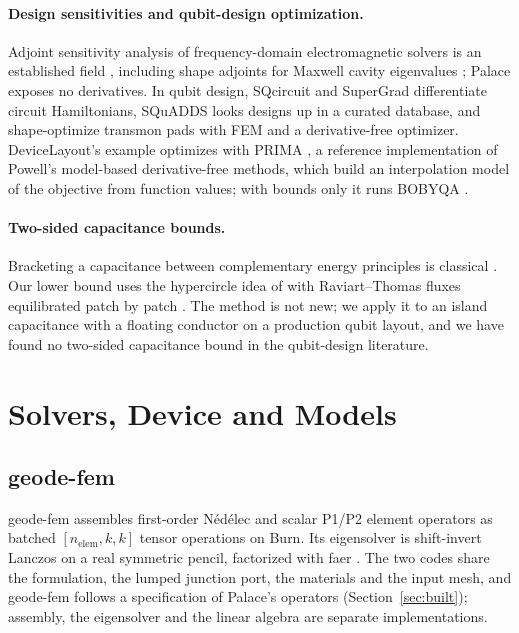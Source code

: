 \documentclass{anvil-paper}
\begin{document}
\paragraph{Design sensitivities and qubit-design optimization.}
Adjoint sensitivity analysis of frequency-domain electromagnetic solvers is
an established field \citep{nikolova2004adjoint}, including shape adjoints
for Maxwell cavity eigenvalues \citep{akcelik2005adjoint}; Palace exposes no
derivatives.
In qubit design, SQcircuit \citep{rajabzadeh2023analysis} and
SuperGrad \citep{wang2025supergrad} differentiate circuit Hamiltonians,
SQuADDS \citep{shanto2024squadds} looks designs up in a curated
database, and \citet{eun2023shape} shape-optimize transmon pads with FEM
and a derivative-free optimizer.
DeviceLayout's example optimizes with PRIMA \citep{zhang2023prima}, a
reference implementation of Powell's model-based derivative-free methods,
which build an interpolation model of the objective from function values;
with bounds only it runs BOBYQA \citep{powell2009bobyqa}.

\paragraph{Two-sided capacitance bounds.}
Bracketing a capacitance between complementary energy principles is
classical \citep{specogna2011complementary}. Our lower bound uses the
hypercircle idea of \citet{prager1947approximations} with Raviart--Thomas
fluxes \citep{raviart1977mixed} equilibrated patch by patch
\citep{braess2007equilibrated,ern2015polynomial}. The method is not new; we
apply it to an island capacitance with a floating conductor on a
production qubit layout, and we have found no two-sided capacitance bound in the
qubit-design literature.

\section{Solvers, Device and Models}
\label{sec:setup}

\subsection{geode-fem}
\label{sec:architecture}

geode-fem assembles first-order N\'ed\'elec \citep{nedelec1980} and scalar
P1/P2 element operators as batched $[n_{\mathrm{elem}},k,k]$ tensor
operations on Burn. Its eigensolver is shift-invert Lanczos \citep{arpack}
on a real symmetric pencil, factorized with faer \citep{kazdadi2026faer}. The two codes share the
formulation, the lumped junction port, the materials and the input mesh,
and geode-fem follows a specification of Palace's operators
(Section~\ref{sec:built}); assembly, the eigensolver and the linear algebra
are separate implementations.
\end{document}
